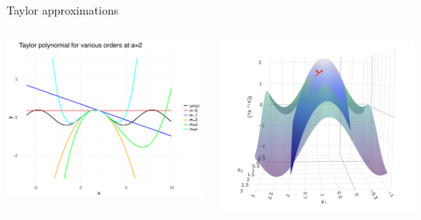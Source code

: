 \documentclass[11pt,compress,t,notes=noshow, xcolor=table]{beamer}
\begin{document}
\begin{vbframe}{Taylor approximations}
\begin{columns}
\begin{column}{0.45\textwidth}
\includegraphics[width=\columnwidth]{figure_man/taylor_univariate.png}
\end{column}
\begin{column}{0.55\textwidth}
\includegraphics[width=\columnwidth]{figure_man/Taylor2D_2nd-100.png}
\end{column}
\end{columns}


\end{vbframe}
\end{document}
